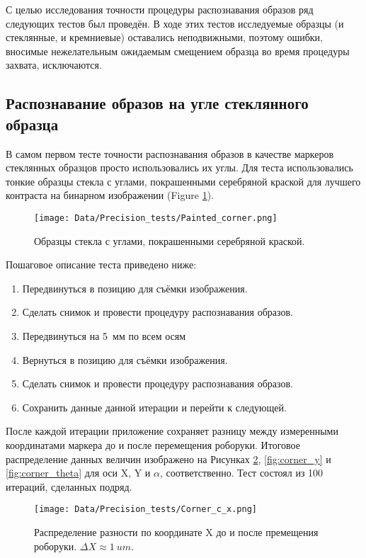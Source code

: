 С целью исследования точности процедуры распознавания образов ряд следующих тестов был проведён. В ходе этих тестов исследуемые образцы (и стеклянные, и кремниевые) оставались неподвижными, поэтому ошибки, вносимые нежелательным ожидаемым смещением образца во время процедуры захвата, исключаются.

\subsection{Распознавание образов на угле стеклянного образца}

В самом первом тесте точности распознавания образов в качестве маркеров стеклянных образцов просто использовались их углы. Для теста использовались тонкие образцы стекла с углами, покрашенными серебряной краской для лучшего контраста на бинарном изображении (Figure \ref{fig:painted_corner}).

\begin{figure}[ht]\centering
\texttt{[image: Data/Precision\_tests/Painted\_corner.png]}
\caption{Образцы стекла с углами, покрашенными серебряной краской.}
\label{fig:painted_corner}
\end{figure}

Пошаговое описание теста приведено ниже:

\begin{enumerate}
\setlength\itemsep{-0.5em}
\item Передвинуться в позицию для съёмки изображения.
\item Сделать снимок и провести процедуру распознавания образов.
\item Передвинуться на 5~мм по всем осям
\item Вернуться в позицию для съёмки изображения.
\item Сделать снимок и провести процедуру распознавания образов.
\item Сохранить данные данной итерации и перейти к следующей.
\end{enumerate}

После каждой итерации приложение сохраняет разницу между измеренными координатами маркера до и после перемещения роборуки. Итоговое распределение данных величин изображено на Рисунках \ref{fig:corner_x}, \ref{fig:corner_y} и \ref{fig:corner_theta} для оси X, Y и $\alpha$, соответственно. Тест состоял из 100 итераций, сделанных подряд.

\begin{figure}[ht]\centering
\texttt{[image: Data/Precision\_tests/Corner\_c\_x.png]}
\caption{Распределение разности по координате X до и после премещения роборуки. $\Delta X \approx 1~um$. }
\label{fig:corner_x}
\end{figure}

